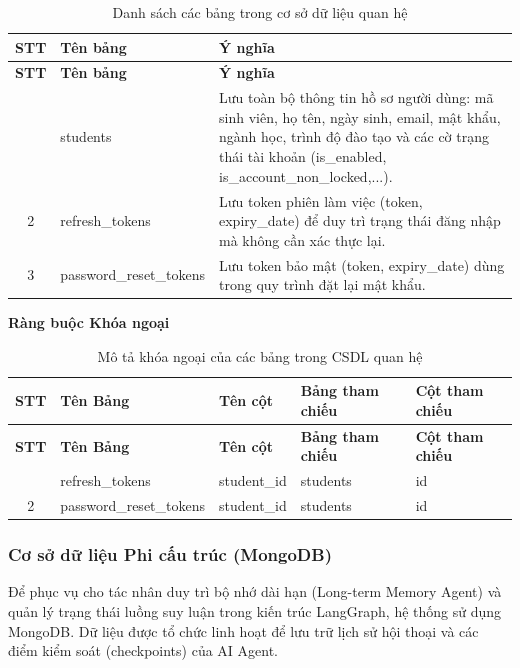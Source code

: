 {
	\renewcommand{\arraystretch}{1.4}
	\begin{longtable}{|c|>{\raggedright\arraybackslash}p{5.5cm}|>{\raggedright\arraybackslash}p{7.5cm}|}
		\caption{Danh sách các bảng trong cơ sở dữ liệu quan hệ} \label{tab:danh_sach_bang} \\
		\hline
		\textbf{STT} & \textbf{Tên bảng} & \textbf{Ý nghĩa} \\ \hline
		\endfirsthead
		\hline
		\textbf{STT} & \textbf{Tên bảng} & \textbf{Ý nghĩa} \\ \hline
		\endhead
		\hline
		\endfoot
		1 & students & Lưu toàn bộ thông tin hồ sơ người dùng: mã sinh viên, họ tên, ngày sinh, email, mật khẩu, ngành học, trình độ đào tạo và các cờ trạng thái tài khoản (is\_enabled, is\_account\_non\_locked,...). \\ \hline
		2 & refresh\_tokens & Lưu token phiên làm việc (token, expiry\_date) để duy trì trạng thái đăng nhập mà không cần xác thực lại. \\ \hline
		3 & password\_reset\_tokens & Lưu token bảo mật (token, expiry\_date) dùng trong quy trình đặt lại mật khẩu. \\ \hline
	\end{longtable}
}

\textbf{Ràng buộc Khóa ngoại}

{
	\renewcommand{\arraystretch}{1.4}
	\begin{longtable}{|c|>{\raggedright\arraybackslash}p{5cm}|>{\raggedright\arraybackslash}p{2.5cm}|>{\raggedright\arraybackslash}p{2cm}|>{\raggedright\arraybackslash}p{1.5cm}|}
		\caption{Mô tả khóa ngoại của các bảng trong CSDL quan hệ} \label{tab:khoa_ngoai} \\
		\hline
		\textbf{STT} & \textbf{Tên Bảng} & \textbf{Tên cột} & \textbf{Bảng tham chiếu} & \textbf{Cột tham chiếu} \\ \hline
		\endfirsthead
		\hline
		\textbf{STT} & \textbf{Tên Bảng} & \textbf{Tên cột} & \textbf{Bảng tham chiếu} & \textbf{Cột tham chiếu} \\ \hline
		\endhead
		\hline
		\endfoot
		1 & refresh\_tokens & student\_id & students & id \\ \hline
		2 & password\_reset\_tokens & student\_id & students & id \\ \hline
	\end{longtable}
}

\subsubsection{Cơ sở dữ liệu Phi cấu trúc (MongoDB)}
Để phục vụ cho tác nhân duy trì bộ nhớ dài hạn (Long-term Memory Agent) và quản lý trạng thái luồng suy luận trong kiến trúc LangGraph, hệ thống sử dụng MongoDB. Dữ liệu được tổ chức linh hoạt để lưu trữ lịch sử hội thoại và các điểm kiểm soát (checkpoints) của AI Agent.

